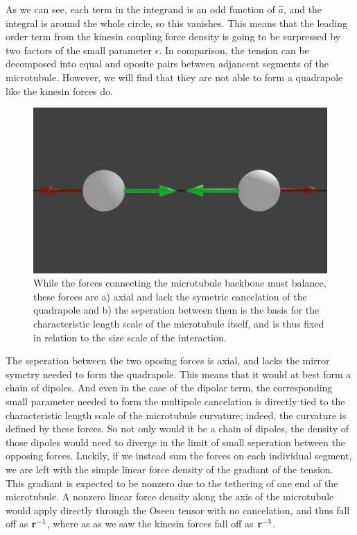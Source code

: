 \documentclass[11pt]{ucthesis}
\def\br{{\bf r}}
\begin{document}
As we can see, each term in the integrand is an odd function of $\hat{a}$, and the integral is around the whole circle, so this vanishes. 
This means that the leading order term from the kinesin coupling force density is going to be surpressed by two factors of the small parameter $\epsilon$.
In comparison, the tension can be decomposed into equal and oposite pairs between adjancent segments of the microtubule. However, we will find that they are not able to form a quadrapole like the kinesin forces do.
\begin{figure}[htp]
\begin{center}
\includegraphics[width=\hsize]{tenbal.png}
\caption{ 
While the forces connecting the microtubule backbone must balance, these forces are a) axial and lack the symetric cancelation of the quadrapole and b) the seperation between them is the basis for the characteristic length scale of the microtubule itself, and is thus fixed in relation to the size scale of the interaction.
}
\label{fig:quadforce}
\end{center}
\end{figure}
The seperation between the two oposing forces is axial, and lacks the mirror symetry needed to form the quadrapole. This means that it would at best form a chain of dipoles. 
And even in the case of the dipolar term,  the corresponding small parameter needed to form the multipole cancelation is directly tied to the characteristic length scale of the microtubule curvature; indeed, the curvature is defined by these forces. 
So not only would it be a chain of dipoles, the density of those dipoles would need to diverge in the limit of small seperation between the opposing forces.
Luckily, if we instead sum the forces on each individual segment, we are left with the simple linear force density of the gradiant of the tension. This gradiant is expected to be nonzero due to the tethering of one end of the microtubule.
A nonzero linear force density along the axis of the microtubule would apply directly through the Oseen tensor with no cancelation, and thus fall off as $\br^{-1}$, where as as we saw the kinesin forces fall off as $\br^{-3}$.
 
\end{document}
